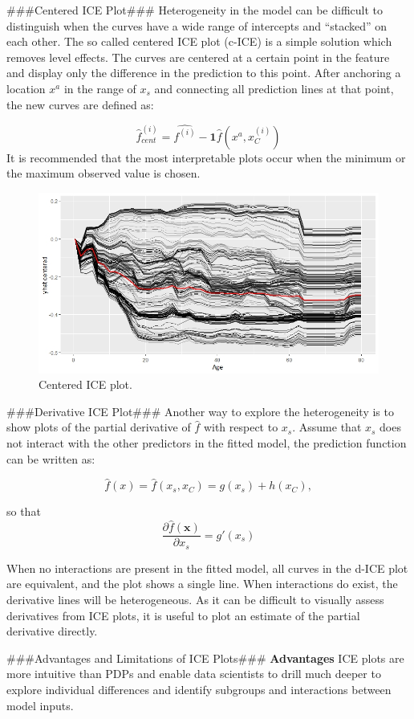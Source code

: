 \documentclass[
]{krantz}
\begin{document}
\#\#\#Centered ICE Plot\#\#\#
Heterogeneity in the model can be difficult to distinguish when the curves have a wide range of intercepts and ``stacked'' on each other. The so called centered ICE plot (c-ICE) is a simple solution which removes level effects. The curves are centered at a certain point in the feature and display only the difference in the prediction to this point. \citep{molnar2019} After anchoring a location \(x^a\) in the range of \(x_s\) and connecting all prediction lines at that point, the new curves are defined as:

\[\hat{f}^{(i)}_{cent} = \hat{f^{(i)}} - \mathbf{1}\hat{f}(x^a,x^{(i)}_C)\]
It is recommended that the most interpretable plots occur when the minimum or the maximum observed value is chosen.

\begin{figure}
\includegraphics[width=0.8\linewidth]{images/c_ice_plot} \caption{Centered ICE plot.}\label{fig:unnamed-chunk-6}
\end{figure}

\#\#\#Derivative ICE Plot\#\#\#
Another way to explore the heterogeneity is to show plots of the partial derivative
of \(\hat{f}\) with respect to \(x_s\). Assume that \(x_s\) does not interact
with the other predictors in the fitted model, the prediction function can be written as:

\[\hat{f}(x) = \hat{f}(x_s,x_C) = g(x_s) + h(x_C),\]

so that \[\frac{\partial{\hat{f}(\mathbf{x})}}{\partial x_s} = g'(x_s)\]

When no interactions are present in the fitted model, all curves in the d-ICE plot are equivalent, and the plot shows a single line. When interactions do exist, the derivative lines will be heterogeneous. As it can be difficult to visually assess derivatives from ICE plots, it is useful to plot an estimate of the partial derivative directly.\citep{Goldstein2013}

\#\#\#Advantages and Limitations of ICE Plots\#\#\#
\textbf{Advantages}
ICE plots are more intuitive than PDPs and enable data scientists to drill much deeper to explore individual differences and identify subgroups and interactions between model inputs.
\end{document}
